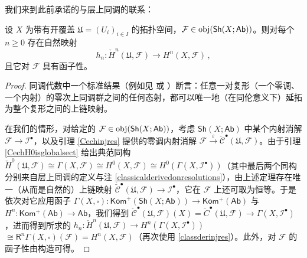 我们来到此前承诺的与层上同调的联系：

\begin{Pro}
设 $X$ 为带有开覆盖 $\mathfrak{U}=(U_i)_{i\in I}$ 的拓扑空间，$\mathcal{F}\in\textup{obj}(\mathsf{Sh}(X;\mathsf{Ab}))$。则对每个 $n\geq 0$ 存在自然映射
\begin{equation}\label{Cechsheafcohmap}
	h_n:\check{H}^n(\mathfrak{U},\mathcal{F})\rightarrow H^n(X,\mathcal{F})\,,
\end{equation}
且它对 $\mathcal{F}$ 具有函子性。
\end{Pro}

\begin{proof}
同调代数中一个标准结果（例如见 \cite[Theorem III.1.3]{[GM03]} 或 \cite[Theorem IV.4.4]{[HS97]}）断言：任意一对复形（一个零调、一个内射）的零次上同调群之间的任何态射，都可以唯一地（在同伦意义下）延拓为整个复形之间的上链映射。

在我们的情形，对给定的 $\mathcal{F}\in\textup{obj}(\mathsf{Sh}(X;\mathsf{Ab}))$，考虑 $\mathsf{Sh}(X;\mathsf{Ab})$ 中某个内射消解 $\mathcal{F}\rightarrow\mathcal{I}^\bullet$，以及引理 \ref{Cechinjres} 提供的零调内射消解 $\mathcal{F}\xrightarrow{\varepsilon}\check{\mathcal{C}}^\bullet(\mathfrak{U},\mathcal{F})$。由于引理 \ref{CechH0isglobalsect} 给出典范同构 $\check{H}^0(\mathfrak{U},\mathcal{F})\cong\Gamma(X,\mathcal{F})\cong H^0(X,\mathcal{F})\cong H^0(\Gamma(X,\mathcal{I}^\bullet))$（其中最后两个同构分别来自层上同调的定义与注 \ref{classicalderivedonresolutions}），由上述定理存在唯一（从而是自然的）上链映射 $\check{\mathcal{C}}^\bullet(\mathfrak{U},\mathcal{F})\rightarrow\mathcal{I}^\bullet$，它在 $\mathcal{F}$ 上还可取为恒等。于是依次对它应用函子 $\Gamma(X,\square):\mathsf{Kom}^+(\mathsf{Sh}(X;\mathsf{Ab}))\rightarrow \mathsf{Kom^+(Ab)}$ 与 $H^n:\mathsf{Kom^+(Ab)}\rightarrow\mathsf{Ab}$，我们得到 $\check{\mathcal{C}}^\bullet(\mathfrak{U},\mathcal{F})(X)=\check{C}^\bullet(\mathfrak{U},\mathcal{F})\rightarrow\Gamma(X,\mathcal{I}^\bullet)$，进而得到所求的 $h_n: \check{H}^n(\mathfrak{U},\mathcal{F})\rightarrow H^n(\Gamma(X,\mathcal{I}^\bullet))$ $\cong\mathsf{R}^n\Gamma(X,\square)(\mathcal{F})=H^n(X,\mathcal{F})$（再次使用 \eqref{classderinjres}）。此外，对 $\mathcal{F}$ 的函子性由构造可得。 
\end{proof}

